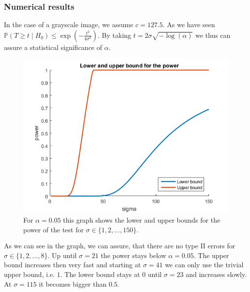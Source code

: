 \documentclass{beamer}
\begin{document}
\begin{frame}
	\subsubsection{Numerical results}
	
	In the case of a grayscale image, we assume $c = 127.5$. As we have seen $\mathbb{P}(T \geq t \mid H_0) \leq \exp \left( - \frac{t^2}{4 \sigma^2} \right)$. By taking $t = 2 \sigma \sqrt{- \log(\alpha)}$ we thus can assure a statistical significance of $\alpha$.
	
	\begin{figure}[h]
		\includegraphics[width=0.6\linewidth]{Testing/Power_Bounds}
		\caption[Power bounds]{For $\alpha = 0.05$ this graph shows the lower and upper bounds for the power of the test for $\sigma \in \{ 1, 2, \dots, 150 \}$.}
		\label{fig:demo1comparison}
	\end{figure}
\end{frame}

\begin{frame}
	As we can see in the graph, we can assure, that there are no type II errors for $\sigma \in \{ 1, 2, \dots, 8 \}$. Up until $\sigma = 21$ the power stays below $\alpha = 0.05$. The upper bound increases then very fast and starting at $\sigma = 41$ we can only use the trivial upper bound, i.e. $1$. The lower bound stays at $0$ until $\sigma = 23$ and increases slowly. At $\sigma = 115$ it becomes bigger than $0.5$.
\end{frame}
\end{document}
